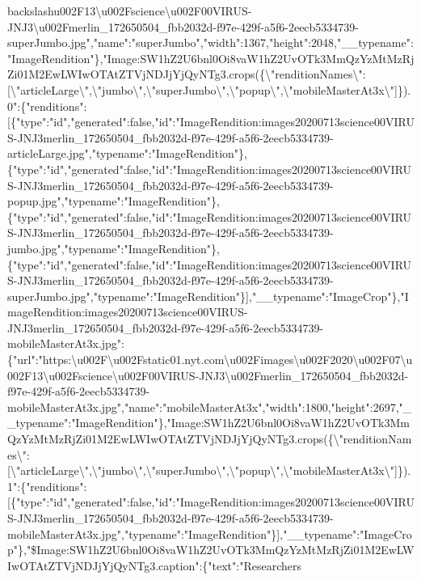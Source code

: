 backslash{}u002F13\textbackslash{}u002Fscience\textbackslash{}u002F00VIRUS-JNJ3\textbackslash{}u002Fmerlin\_172650504\_fbb2032d-f97e-429f-a5f6-2eecb5334739-superJumbo.jpg","name":"superJumbo","width":1367,"height":2048,"\_\_typename":"ImageRendition"\},"Image:SW1hZ2U6bnl0Oi8vaW1hZ2UvOTk3MmQzYzMtMzRjZi01M2EwLWIwOTAtZTVjNDJjYjQyNTg3.crops(\{\textbackslash{}"renditionNames\textbackslash{}":{[}\textbackslash{}"articleLarge\textbackslash{}",\textbackslash{}"jumbo\textbackslash{}",\textbackslash{}"superJumbo\textbackslash{}",\textbackslash{}"popup\textbackslash{}",\textbackslash{}"mobileMasterAt3x\textbackslash{}"{]}\}).0":\{"renditions":{[}\{"type":"id","generated":false,"id":"ImageRendition:images20200713science00VIRUS-JNJ3merlin\_172650504\_fbb2032d-f97e-429f-a5f6-2eecb5334739-articleLarge.jpg","typename":"ImageRendition"\},\{"type":"id","generated":false,"id":"ImageRendition:images20200713science00VIRUS-JNJ3merlin\_172650504\_fbb2032d-f97e-429f-a5f6-2eecb5334739-popup.jpg","typename":"ImageRendition"\},\{"type":"id","generated":false,"id":"ImageRendition:images20200713science00VIRUS-JNJ3merlin\_172650504\_fbb2032d-f97e-429f-a5f6-2eecb5334739-jumbo.jpg","typename":"ImageRendition"\},\{"type":"id","generated":false,"id":"ImageRendition:images20200713science00VIRUS-JNJ3merlin\_172650504\_fbb2032d-f97e-429f-a5f6-2eecb5334739-superJumbo.jpg","typename":"ImageRendition"\}{]},"\_\_typename":"ImageCrop"\},"ImageRendition:images20200713science00VIRUS-JNJ3merlin\_172650504\_fbb2032d-f97e-429f-a5f6-2eecb5334739-mobileMasterAt3x.jpg":\{"url":"https:\textbackslash{}u002F\textbackslash{}u002Fstatic01.nyt.com\textbackslash{}u002Fimages\textbackslash{}u002F2020\textbackslash{}u002F07\textbackslash{}u002F13\textbackslash{}u002Fscience\textbackslash{}u002F00VIRUS-JNJ3\textbackslash{}u002Fmerlin\_172650504\_fbb2032d-f97e-429f-a5f6-2eecb5334739-mobileMasterAt3x.jpg","name":"mobileMasterAt3x","width":1800,"height":2697,"\_\_typename":"ImageRendition"\},"Image:SW1hZ2U6bnl0Oi8vaW1hZ2UvOTk3MmQzYzMtMzRjZi01M2EwLWIwOTAtZTVjNDJjYjQyNTg3.crops(\{\textbackslash{}"renditionNames\textbackslash{}":{[}\textbackslash{}"articleLarge\textbackslash{}",\textbackslash{}"jumbo\textbackslash{}",\textbackslash{}"superJumbo\textbackslash{}",\textbackslash{}"popup\textbackslash{}",\textbackslash{}"mobileMasterAt3x\textbackslash{}"{]}\}).1":\{"renditions":{[}\{"type":"id","generated":false,"id":"ImageRendition:images20200713science00VIRUS-JNJ3merlin\_172650504\_fbb2032d-f97e-429f-a5f6-2eecb5334739-mobileMasterAt3x.jpg","typename":"ImageRendition"\}{]},"\_\_typename":"ImageCrop"\},"\$Image:SW1hZ2U6bnl0Oi8vaW1hZ2UvOTk3MmQzYzMtMzRjZi01M2EwLWIwOTAtZTVjNDJjYjQyNTg3.caption":\{"text":"Researchers
